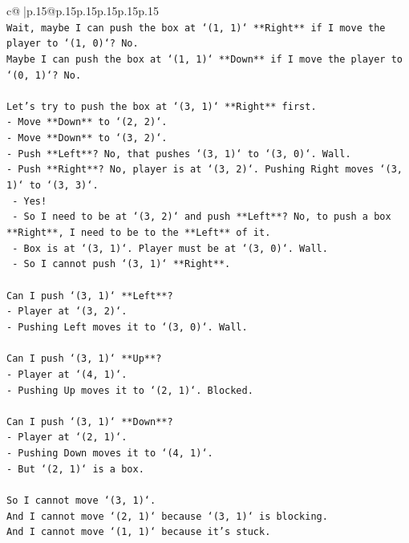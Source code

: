 \documentclass{article}
\begin{document}
{\begin{supertabular}{c@{$\;$}|p{.15\linewidth}@{}p{.15\linewidth}p{.15\linewidth}p{.15\linewidth}p{.15\linewidth}p{.15\linewidth}}
{{{\\ 
\texttt{Wait, maybe I can push the box at `(1, 1)` **Right** if I move the player to `(1, 0)`? No.} \\
\texttt{Maybe I can push the box at `(1, 1)` **Down** if I move the player to `(0, 1)`? No.} \\
\\ 
\texttt{Let's try to push the box at `(3, 1)` **Right** first.} \\
\texttt{{-} Move **Down** to `(2, 2)`.} \\
\texttt{{-} Move **Down** to `(3, 2)`.} \\
\texttt{{-} Push **Left**? No, that pushes `(3, 1)` to `(3, 0)`. Wall.} \\
\texttt{{-} Push **Right**? No, player is at `(3, 2)`. Pushing Right moves `(3, 1)` to `(3, 3)`.} \\
\texttt{  {-} Yes!} \\
\texttt{  {-} So I need to be at `(3, 2)` and push **Left**? No, to push a box **Right**, I need to be to the **Left** of it.} \\
\texttt{  {-} Box is at `(3, 1)`. Player must be at `(3, 0)`. Wall.} \\
\texttt{  {-} So I cannot push `(3, 1)` **Right**.} \\
\\ 
\texttt{Can I push `(3, 1)` **Left**?} \\
\texttt{{-} Player at `(3, 2)`.} \\
\texttt{{-} Pushing Left moves it to `(3, 0)`. Wall.} \\
\\ 
\texttt{Can I push `(3, 1)` **Up**?} \\
\texttt{{-} Player at `(4, 1)`.} \\
\texttt{{-} Pushing Up moves it to `(2, 1)`. Blocked.} \\
\\ 
\texttt{Can I push `(3, 1)` **Down**?} \\
\texttt{{-} Player at `(2, 1)`.} \\
\texttt{{-} Pushing Down moves it to `(4, 1)`.} \\
\texttt{{-} But `(2, 1)` is a box.} \\
\\ 
\texttt{So I cannot move `(3, 1)`.} \\
\texttt{And I cannot move `(2, 1)` because `(3, 1)` is blocking.} \\
\texttt{And I cannot move `(1, 1)` because it's stuck.} \\
}}}
\end{supertabular}}
\end{document}
